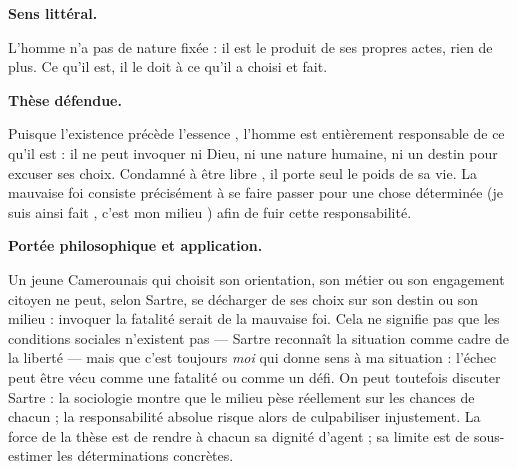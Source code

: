 \documentclass[11pt]{article}
\begin{document}
\begin{corrige}

\textbf{Sens littéral.}\par L'homme n'a pas de nature fixée : il est le produit de ses propres actes, rien de plus. Ce qu'il est, il le doit à ce qu'il a choisi et fait.

\textbf{Thèse défendue.}\par Puisque \guillemotleft l'existence précède l'essence \guillemotright, l'homme est entièrement responsable de ce qu'il est : il ne peut invoquer ni Dieu, ni une nature humaine, ni un destin pour excuser ses choix. \guillemotleft Condamné à être libre \guillemotright, il porte seul le poids de sa vie. La \guillemotleft mauvaise foi \guillemotright consiste précisément à se faire passer pour une chose déterminée (\guillemotleft je suis ainsi fait \guillemotright, \guillemotleft c'est mon milieu \guillemotright) afin de fuir cette responsabilité.

\textbf{Portée philosophique et application.}\par Un jeune Camerounais qui choisit son orientation, son métier ou son engagement citoyen ne peut, selon Sartre, se décharger de ses choix sur son \guillemotleft destin \guillemotright ou son \guillemotleft milieu \guillemotright : invoquer la fatalité serait de la mauvaise foi. Cela ne signifie pas que les conditions sociales n'existent pas — Sartre reconnaît la situation comme cadre de la liberté — mais que c'est toujours \emph{moi} qui donne sens à ma situation : l'échec peut être vécu comme une fatalité ou comme un défi. On peut toutefois discuter Sartre : la sociologie montre que le milieu pèse réellement sur les chances de chacun ; la responsabilité absolue risque alors de culpabiliser injustement. La force de la thèse est de rendre à chacun sa dignité d'agent ; sa limite est de sous-estimer les déterminations concrètes.

\end{corrige}
\end{document}
